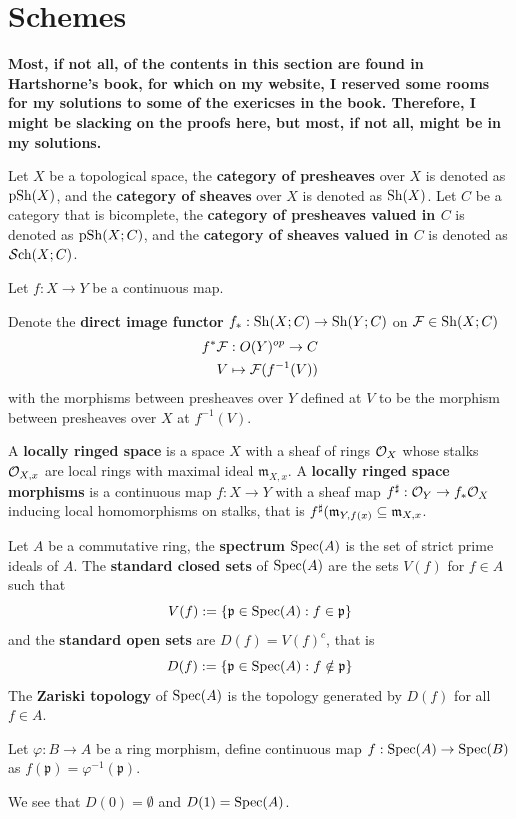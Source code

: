 \section{Schemes}\label{sec:algebraicgeometry-schemes}
\textbf{Most, if not all, of the contents in this section are found in Hartshorne's book, for which on my website, I reserved some rooms for my solutions to some of the exericses in the book. Therefore, I might be slacking on the proofs here, but most, if not all, might be in my solutions.}

\begin{definition}
    Let $X$ be a topological space, the \textbf{category of presheaves} over $X$ is denoted as $\mathrm{pSh}(X)$, and the \textbf{category of sheaves} over $X$ is denoted as $\mathrm{Sh}(X)$. 
    Let $C$ be a category that is bicomplete, the \textbf{category of presheaves valued in $C$} is denoted as $\mathrm{pSh}(X;C)$, and the \textbf{category of sheaves valued in $C$} is denoted as $\mathcal{S}\mathrm{ch}(X;C)$.

    Let $f: X\to Y$ be a continuous map.
    
    Denote the \textbf{direct image functor} $f_*: \mathrm{Sh}(X;C)\to \mathrm{Sh}(Y;C)$ on $\mathcal{F}\in \mathrm{Sh}(X;C)$
    \begin{align*}
        f^*\mathcal{F}: O(Y)^{op}\to C 
        \\ V\mapsto \mathcal{F}(f^{-1}(V))
    \end{align*}with the morphisms between presheaves over $Y$ defined at $V$ to be the morphism between presheaves over $X$ at $f^{-1}(V)$.
\end{definition}


\begin{definition}
A \textbf{locally ringed space} is a space $X$ with a sheaf of rings
$\mathcal{O}_X$ whose stalks $\mathcal{O}_{X,x}$ are local rings with maximal ideal $ \mathfrak{m}_{X,x}$. A \textbf{locally ringed space morphisms} is a continuous map
$f:X\to Y$ with a sheaf map $f^{\operatorname{\sharp}}: \mathcal{O}_Y\to f_*\mathcal{O}_X$ inducing local
homomorphisms on stalks, that is $f^{\operatorname{\sharp}}(\mathfrak{m}_{Y,f(x)}\subseteq \mathfrak{m}_{X,x}$.
\end{definition}

\begin{definition}
    Let $A$ be a commutative ring, the \textbf{spectrum} $\operatorname{\mathrm{Spec}}(A)$ is the set of strict prime ideals of $A$. The \textbf{standard closed sets} of $\operatorname{\mathrm{Spec}}(A)$ are the sets $V(f)$ for $f\in A$ such that
    \[
    V(f):=\{\mathfrak{p}\in \operatorname{\mathrm{Spec}}(A): f\in \mathfrak{p}\}
    \]and the \textbf{standard open sets} are $D(f)=V(f)^c$, that is 
    \[
    D(f):=\{\mathfrak{p}\in \operatorname{\mathrm{Spec}}(A): f\notin \mathfrak{p}\}
    \]The \textbf{Zariski topology} of $\operatorname{\mathrm{Spec}}(A)$ is the topology generated by $D(f)$ for all $f \in A$.

    Let $\varphi: B\to A$ be a ring morphism, define continuous map $f:\operatorname{\mathrm{Spec}}(A)\to \operatorname{\mathrm{Spec}}(B)$ as $f(\mathfrak{p})=\varphi^{-1}(\mathfrak{p})$.
\end{definition}
We see that $D(0)=\emptyset$ and $D(1)=\operatorname{\mathrm{Spec}}(A)$.

